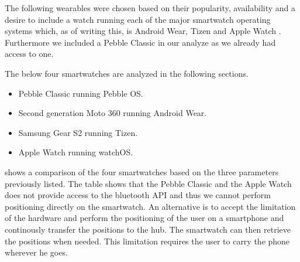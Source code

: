 The following wearables were chosen based on their popularity, availability and a desire to include a watch running each of the major smartwatch operating systems which, as of writing this, is Android Wear, Tizen and Apple Watch . Furthermore we included a Pebble Classic in our analyze as we already had access to one.

The below four smartwatches are analyzed in the following sections.

\begin{itemize}
\item Pebble Classic running Pebble OS.
\item Second generation Moto 360 running Android Wear.
\item Samsung Gear S2 running Tizen.
\item Apple Watch running watchOS.
\end{itemize}

 shows a comparison of the four smartwatches based on the three parameters previously listed. The table shows that the Pebble Classic and the Apple Watch does not provide access to the bluetooth API and thus we cannot perform positioning directly on the smartwatch. An alternative is to accept the limitation of the hardware and perform the positioning of the user on a smartphone and continously transfer the positions to the hub. The smartwatch can then retrieve the positions when needed.
This limitation requires the user to carry the phone wherever he goes.

